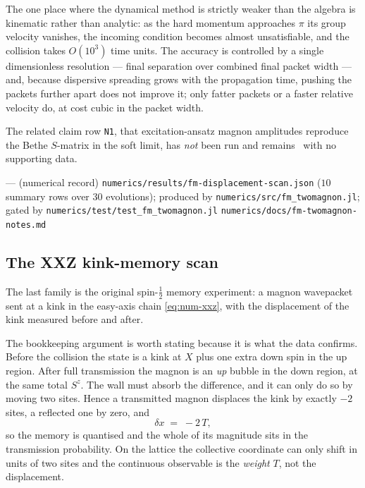 The one place where the dynamical method is strictly weaker than the algebra
is kinematic rather than analytic: as the hard momentum approaches $\pi$ its
group velocity vanishes, the incoming condition becomes almost unsatisfiable,
and the collision takes $O(10^3)$ time units. The accuracy is controlled by a
single dimensionless resolution --- final separation over combined final
packet width --- and, because dispersive spreading grows with the propagation
time, pushing the packets further apart does not improve it; only fatter
packets or a faster relative velocity do, at cost cubic in the packet width.

The related claim row \texttt{N1}, that excitation-ansatz magnon amplitudes
reproduce the Bethe $S$-matrix in the soft limit, has \emph{not} been run and
remains \statusConjecture\ with no supporting data.

{--- (numerical record)}
{\texttt{numerics/\allowbreak{}results/\allowbreak{}fm-\allowbreak{}displacement-\allowbreak{}scan.json} ($10$ summary rows over
 $30$ evolutions); produced by \texttt{numerics/\allowbreak{}src/\allowbreak{}fm\_\allowbreak{}twomagnon.jl};
 gated by \texttt{numerics/\allowbreak{}test/\allowbreak{}test\_\allowbreak{}fm\_\allowbreak{}twomagnon.jl}}
{\texttt{numerics/\allowbreak{}docs/\allowbreak{}fm-\allowbreak{}twomagnon-\allowbreak{}notes.md}}

\subsection{The XXZ kink-memory scan}\label{sec:numerics-xxz}

The last family is the original spin-$\tfrac12$ memory experiment: a magnon
wavepacket sent at a kink in the easy-axis chain \cref{eq:num-xxz}, with the
displacement of the kink measured before and after.

The bookkeeping argument is worth stating because it is what the data
confirms. Before the collision the state is a kink at $X$ plus one extra down
spin in the up region. After full transmission the magnon is an \emph{up}
bubble in the down region, at the same total $S^z$. The wall must absorb the
difference, and it can only do so by moving two sites. Hence a transmitted
magnon displaces the kink by exactly $-2$ sites, a reflected one by zero, and
\begin{equation}
  \delta x \;=\; -2\,T ,
  \label{eq:num-dx2T}
\end{equation}
so the memory is quantised and the whole of its magnitude sits in the
transmission probability. On the lattice the collective coordinate can only
shift in units of two sites and the continuous observable is the \emph{weight}
$T$, not the displacement.

